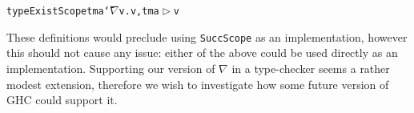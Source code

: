 \documentclass[9pt,preprint,authoryear]{sigplanconf}
\begin{document}
{{{}\vphantom{$\{$}}}\textcolor[cmyk]{0,0.65,0.99,0}{\texttt{type}}\textcolor[rgb]{0,0,0.80}{\texttt{\mbox{\hspace{0.50em}}}}\textcolor[rgb]{0,0,0.80}{\texttt{ExistScope}}\textcolor[rgb]{0,0,0.80}{\texttt{\mbox{\hspace{0.50em}}}}\textcolor[rgb]{0,0,0.80}{\texttt{tm}}\textcolor[rgb]{0,0,0.80}{\texttt{\mbox{\hspace{0.50em}}}}\textcolor[rgb]{0,0,0.80}{\texttt{a}}\textcolor[rgb]{0,0,0.80}{\texttt{\mbox{\hspace{0.50em}}}}\textcolor[cmyk]{0,0.65,0.99,0}{\texttt{{\char `\=}}}\textcolor[rgb]{0,0,0.80}{\texttt{\mbox{\hspace{0.50em}}}}\textcolor[cmyk]{0,0.65,0.99,0}{\texttt{\ensuremath{\nabla}}}\textcolor[rgb]{0,0,0.80}{\texttt{\mbox{\hspace{0.50em}}}}\textcolor[rgb]{0,0,0.80}{\texttt{v}}\textcolor[cmyk]{0,0.65,0.99,0}{\texttt{.}}\textcolor[rgb]{0,0,0.80}{\texttt{\mbox{\hspace{0.50em}}}}\textcolor[cmyk]{0,0.65,0.99,0}{\texttt{\makebox[1.22ex][l]{$ {(} $}}}\textcolor[rgb]{0,0,0.80}{\texttt{v}}\textcolor[rgb]{0,0,0.80}{\texttt{\mbox{\hspace{0.50em}}}}\textcolor[cmyk]{0,0.65,0.99,0}{\texttt{,}}\textcolor[rgb]{0,0,0.80}{\texttt{\mbox{\hspace{0.50em}}}}\textcolor[rgb]{0,0,0.80}{\texttt{\mbox{\hspace{0.50em}}}}\textcolor[rgb]{0,0,0.80}{\texttt{tm}}\textcolor[rgb]{0,0,0.80}{\texttt{\mbox{\hspace{0.50em}}}}\textcolor[cmyk]{0,0.65,0.99,0}{\texttt{\makebox[1.22ex][l]{$ {(} $}}}\textcolor[rgb]{0,0,0.80}{\texttt{a}}\textcolor[rgb]{0,0,0.80}{\texttt{\mbox{\hspace{0.50em}}}}\textcolor[rgb]{0,0,0.80}{\texttt{$ \vartriangleright $}}\textcolor[rgb]{0,0,0.80}{\texttt{\mbox{\hspace{0.50em}}}}\textcolor[rgb]{0,0,0.80}{\texttt{v}}\textcolor[cmyk]{0,0.65,0.99,0}{\texttt{\makebox[1.22ex][r]{$ {)} $}}}\textcolor[cmyk]{0,0.65,0.99,0}{\texttt{\makebox[1.22ex][r]{$ {)} $}}}\textcolor[rgb]{0,0,0.80}{\texttt{{\nopagebreak \newline%
}\vphantom{$\{$}}}%


%
%


%
   These definitions would preclude using \textcolor[rgb]{0,0,0.80}{\texttt{SuccScope}} as an implementation, 
   however this should not cause any issue{:} either of the above could be used directly
   as an implementation.
   Supporting our version of \textcolor[cmyk]{0,0.65,0.99,0}{\texttt{\ensuremath{\nabla}}} in a type-checker seems a rather modest extension,
   therefore we wish to investigate how some future version of GHC could support it.
\end{document}

